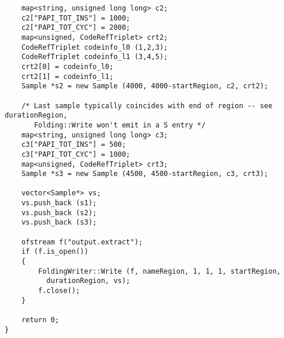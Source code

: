 \begin{lstlisting}
	map<string, unsigned long long> c2;
	c2["PAPI_TOT_INS"] = 1000;
	c2["PAPI_TOT_CYC"] = 2000;
	map<unsigned, CodeRefTriplet> crt2;
	CodeRefTriplet codeinfo_l0 (1,2,3);
	CodeRefTriplet codeinfo_l1 (3,4,5);
	crt2[0] = codeinfo_l0;
	crt2[1] = codeinfo_l1;
	Sample *s2 = new Sample (4000, 4000-startRegion, c2, crt2);

	/* Last sample typically coincides with end of region -- see durationRegion,
	   Folding::Write won't emit in a S entry */
	map<string, unsigned long long> c3;
	c3["PAPI_TOT_INS"] = 500;
	c3["PAPI_TOT_CYC"] = 1000;
	map<unsigned, CodeRefTriplet> crt3;
	Sample *s3 = new Sample (4500, 4500-startRegion, c3, crt3);

	vector<Sample*> vs;
	vs.push_back (s1);
	vs.push_back (s2);
	vs.push_back (s3);

	ofstream f("output.extract");
	if (f.is_open())
	{
		FoldingWriter::Write (f, nameRegion, 1, 1, 1, startRegion,
		  durationRegion, vs);
		f.close();
	}

	return 0;
}
\end{lstlisting}
